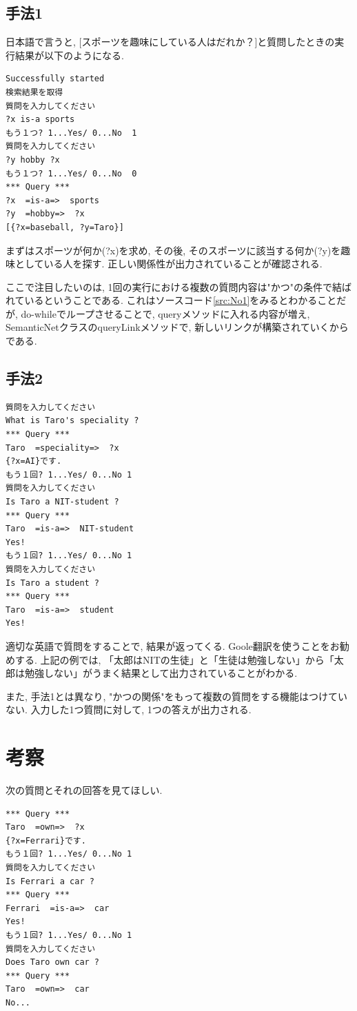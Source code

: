 ﻿\documentclass[uplatex,12pt]{jsarticle}
\begin{document}
\subsection{手法1}
日本語で言うと, [スポーツを趣味にしている人はだれか？]と質問したときの実行結果が以下のようになる.
\begin{lstlisting}
Successfully started
検索結果を取得
質問を入力してください
?x is-a sports
もう１つ? 1...Yes/ 0...No  1
質問を入力してください
?y hobby ?x
もう１つ? 1...Yes/ 0...No  0
*** Query ***
?x  =is-a=>  sports
?y  =hobby=>  ?x
[{?x=baseball, ?y=Taro}]
\end{lstlisting}

まずはスポーツが何か(?x)を求め, その後, そのスポーツに該当する何か(?y)を趣味としている人を探す. 正しい関係性が出力されていることが確認される.

ここで注目したいのは, 1回の実行における複数の質問内容は"かつ"の条件で結ばれているということである. これはソースコード\ref{src:No1}をみるとわかることだが, do-whileでループさせることで, queryメソッドに入れる内容が増え, SemanticNetクラスのqueryLinkメソッドで, 新しいリンクが構築されていくからである.

\subsection{手法2}
\begin{lstlisting}
質問を入力してください
What is Taro's speciality ?
*** Query ***
Taro  =speciality=>  ?x
{?x=AI}です.
もう１回? 1...Yes/ 0...No 1
質問を入力してください
Is Taro a NIT-student ?
*** Query ***
Taro  =is-a=>  NIT-student
Yes!
もう１回? 1...Yes/ 0...No 1
質問を入力してください
Is Taro a student ?
*** Query ***
Taro  =is-a=>  student
Yes!
\end{lstlisting}

適切な英語で質問をすることで, 結果が返ってくる. Goole翻訳を使うことをお勧めする. 上記の例では, 「太郎はNITの生徒」と「生徒は勉強しない」から「太郎は勉強しない」がうまく結果として出力されていることがわかる.

また, 手法1とは異なり, "かつの関係"をもって複数の質問をする機能はつけていない. 入力した1つ質問に対して, 1つの答えが出力される. 

\section{考察}
次の質問とそれの回答を見てほしい.
\begin{lstlisting}
*** Query ***
Taro  =own=>  ?x
{?x=Ferrari}です.
もう１回? 1...Yes/ 0...No 1
質問を入力してください
Is Ferrari a car ?
*** Query ***
Ferrari  =is-a=>  car
Yes!
もう１回? 1...Yes/ 0...No 1
質問を入力してください
Does Taro own car ?
*** Query ***
Taro  =own=>  car
No...
\end{lstlisting}
\end{document}
